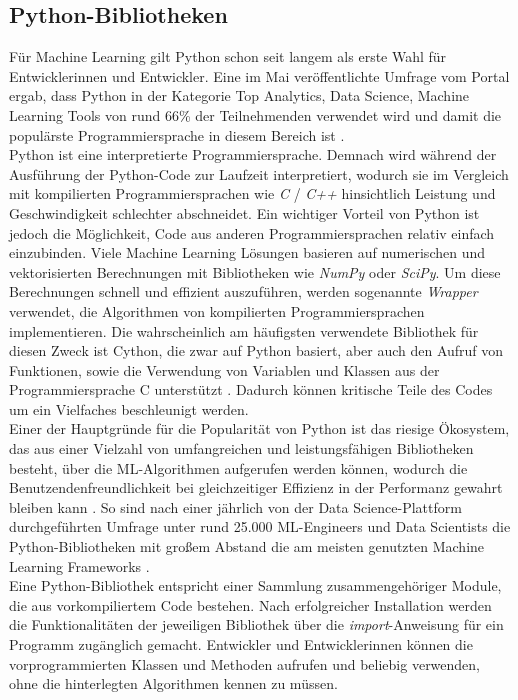 \documentclass[german,bachelor]{swsLeipzig}
\begin{document}
\subsection{Python-Bibliotheken}
Für Machine Learning gilt Python schon seit langem als erste Wahl für Entwicklerinnen und Entwickler.
Eine im Mai \citeyear{nugget} veröffentlichte Umfrage vom Portal \citeauthor{nugget} ergab, dass Python in der Kategorie
\glqq Top Analytics, Data Science, Machine Learning Tools\grqq{} von rund 66\% der Teilnehmenden verwendet wird
und damit die populärste Programmiersprache in diesem Bereich ist \cite[]{nugget}. \\
\indent Python ist eine interpretierte Programmiersprache.
Demnach wird während der Ausführung der Python-Code zur Laufzeit interpretiert, wodurch sie im Vergleich mit kompilierten
Programmiersprachen wie \textit{C} / \textit{C++} hinsichtlich Leistung und Geschwindigkeit schlechter abschneidet.
Ein wichtiger Vorteil von Python ist jedoch die Möglichkeit, Code aus anderen Programmiersprachen relativ einfach einzubinden.
Viele Machine Learning Lösungen basieren auf numerischen und vektorisierten Berechnungen mit Bibliotheken
wie \textit{NumPy} oder \textit{SciPy}.
Um diese Berechnungen schnell und effizient auszuführen, werden sogenannte \textit{Wrapper} verwendet,
die Algorithmen von kompilierten Programmiersprachen implementieren.
Die wahrscheinlich am häufigsten verwendete Bibliothek für diesen Zweck ist Cython, die zwar auf Python basiert,
aber auch den Aufruf von Funktionen, sowie die Verwendung von Variablen und Klassen aus der Programmiersprache C unterstützt \cite[]{8757088}.
Dadurch können kritische Teile des Codes um ein Vielfaches beschleunigt werden. \\
\indent Einer der Hauptgründe für die Popularität von Python ist das riesige Ökosystem, das aus einer Vielzahl
von umfangreichen und leistungsfähigen Bibliotheken besteht, über die ML-Algorithmen aufgerufen werden können,
wodurch die Benutzendenfreundlichkeit bei gleichzeitiger Effizienz in der Performanz gewahrt bleiben kann \cite[]{2020}.
So sind nach einer jährlich von der Data Science-Plattform \citeauthor{kaggle} durchgeführten Umfrage unter rund 25.000 ML-Engineers
und Data Scientists die Python-Bibliotheken mit großem Abstand die am meisten genutzten Machine Learning Frameworks \cite[]{kaggle}.\\
\indent Eine Python-Bibliothek entspricht einer Sammlung zusammengehöriger Module, die aus vorkompiliertem Code bestehen.
Nach erfolgreicher Installation werden die Funktionalitäten der jeweiligen Bibliothek über die \textit{import}-Anweisung für ein Programm zugänglich
gemacht.
Entwickler und Entwicklerinnen können die vorprogrammierten Klassen und Methoden aufrufen und beliebig verwenden,
ohne die hinterlegten Algorithmen kennen zu müssen.
\end{document}
